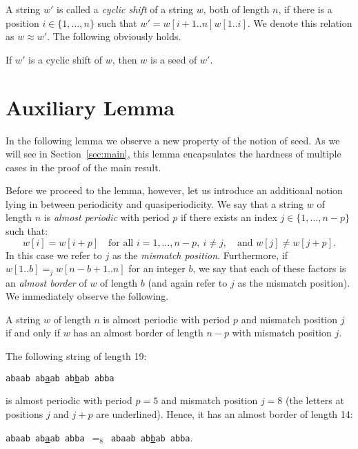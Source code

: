 \documentclass{article}
\begin{document}
  A string $w'$ is called a \emph{cyclic shift} of a string $w$, both of length $n$,
  if there is a position $i \in \{1,\ldots,n\}$ such that $w'=w[i+1..n]w[1..i]$.
  We denote this relation as $w \approx w'$.
  The following obviously holds.

  \begin{observation}\label{obs:cyclic_shift_seed}
    If $w'$ is a cyclic shift of $w$, then $w$ is a seed of $w'$.
  \end{observation}

  \section{Auxiliary Lemma}\label{sec:aux}
  In the following lemma we observe a new property of the notion of seed.
  As we will see in Section~\ref{sec:main}, this lemma encapsulates the hardness of multiple cases in the proof of the main result.

  Before we proceed to the lemma, however, let us introduce an additional notion lying in between periodicity and quasiperiodicity.
  We say that a string $w$ of length $n$ is \emph{almost periodic} with period $p$ if there exists an index
  $j \in \{1,\ldots,n-p\}$ such that:
  $$w[i] = w[i+p] \quad\mbox{for all }i=1,\ldots,n-p,\ i \ne j,\quad\mbox{and }w[j] \ne w[j+p].$$
  In this case we refer to $j$ as the \emph{mismatch position}.
  Furthermore, if $w[1..b] =_j w[n-b+1..n]$ for an integer $b$, we say that each of these factors
  is an \emph{almost border} of $w$ of length $b$ (and again refer to $j$ as the mismatch position).
  We immediately observe the following.

  \begin{observation}\label{obs:almost}
    A string $w$ of length $n$ is almost periodic with period $p$ and mismatch position $j$
    if and only if $w$ has an almost border of length $n-p$ with mismatch position $j$.
  \end{observation}

  \begin{example}
    The following string of length 19:
    \begin{center}
      \texttt{abaab\,ab\underline{a}ab\,ab\underline{b}ab\,abba}
    \end{center}
    is almost periodic with period $p=5$ and mismatch position $j=8$ (the letters at positions $j$ and $j+p$ are underlined).
    Hence, it has an almost border of length 14:
    \begin{center}
      \texttt{abaab\,ab\underline{a}ab\,abba}\ $=_8$\ \texttt{abaab\,ab\underline{b}ab\,abba}.
    \end{center}
  \end{example}
\end{document}
